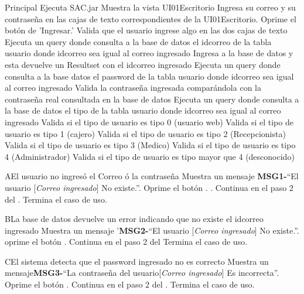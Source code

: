 \begin{UCtrayectoria}{Principal}
\UCpaso[\UCactor] Ejecuta SAC.jar 
\UCpaso Muestra la vista UI01Escritorio
\UCpaso[\UCactor] Ingresa su correo y su contraseña en las cajas de texto correspondientes de la UI01Escritorio.
\UCpaso[\UCactor] Oprime el botón de 'Ingresar.'
\UCpaso Valida que el usuario ingrese algo en las dos cajas de texto 
\UCpaso Ejecuta un query donde consulta a la base de datos el idcorreo de la tabla usuario donde idcorreo sea igual al correo ingresado
\UCpaso Ingresa a la base de datos y esta devuelve un Resultset con el idcorreo ingresado
\UCpaso Ejecuta un query donde consulta a la base datos el password de la tabla usuario donde idcorreo sea igual al correo ingresado
\UCpaso Valida la contraseña ingresada comparándola con la contraseña real consultada en la base de datos 
\UCpaso Ejecuta un query donde consulta a la base de datos el tipo de la tabla usuario donde idcorreo sea igual al correo ingresado
\UCpaso Valida si el tipo de usuario es tipo 0 (usuario web)
\UCpaso Valida si el tipo de usuario es tipo 1 (cajero)
\UCpaso Valida si el tipo de usuario es tipo 2 (Recepcionista)
\UCpaso Valida si el tipo de usuario es tipo 3 (Medico)
\UCpaso Valida si el tipo de usuario es tipo 4 (Administrador)
\UCpaso Valida si el tipo de usuario es tipo mayor que 4 (desconocido)

\end{UCtrayectoria}

\begin{UCtrayectoriaA}{A}{El usuario no ingresó el Correo ó la contraseña}
\UCpaso Muestra un mensaje {\bf MSG1-}``El usuario [{\em Correo ingresado}] No existe.''.
\UCpaso [\UCactor] Oprime el botón . .
\UCpaso Continua en el paso 2 del .
\UCpaso[] Termina el caso de uso.
\end{UCtrayectoriaA}

\begin{UCtrayectoriaA}{B}{La base de datos devuelve un error indicando que no existe el idcorreo ingresado}
\UCpaso Muestra un mensaje '{\bf MSG2-}``El usuario [{\em Correo ingresado}] No existe.''.
\UCpaso[\UCactor] oprime el botón .
\UCpaso Continua en el paso 2 del 
\UCpaso[] Termina el caso de uso.
\end{UCtrayectoriaA}

\begin{UCtrayectoriaA}{C}{El sistema detecta que el password ingresado no es correcto}
\UCpaso Muestra un mensaje{\bf MSG3-}``La contraseña del usuario[{\em Correo ingresado}] Es incorrecta''.
\UCpaso[\UCactor] Oprime el botón . 
\UCpaso Continua en el paso 2 del .
\UCpaso[] Termina el caso de uso.
\end{UCtrayectoriaA}

